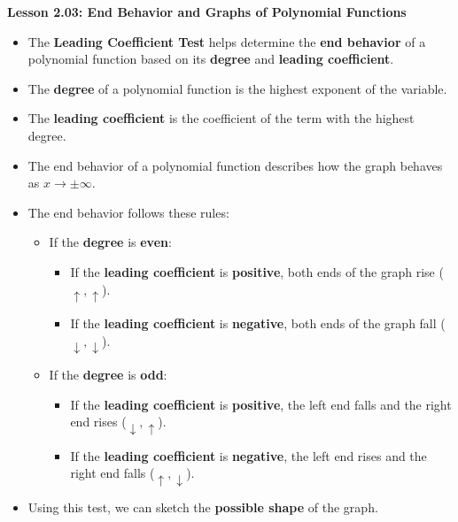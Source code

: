 \begin{center}
\textbf{Lesson 2.03: End Behavior and Graphs of Polynomial Functions}
\end{center}

\vspace*{-1.5ex}

\begin{itemize}
    \item The \textbf{Leading Coefficient Test} helps determine the \textbf{end behavior} of a polynomial function based on its \textbf{degree} and \textbf{leading coefficient}.
    \item The \textbf{degree} of a polynomial function is the highest exponent of the variable.
    \item The \textbf{leading coefficient} is the coefficient of the term with the highest degree.
    \item The end behavior of a polynomial function describes how the graph behaves as \( x \to \pm\infty \).
    \item The end behavior follows these rules:
    \begin{itemize}
        \item If the \textbf{degree} is \textbf{even}:
        \begin{itemize}
            \item If the \textbf{leading coefficient} is \textbf{positive}, both ends of the graph rise (\(\uparrow, \uparrow\)).
            \item If the \textbf{leading coefficient} is \textbf{negative}, both ends of the graph fall (\(\downarrow, \downarrow\)).
        \end{itemize}
        \item If the \textbf{degree} is \textbf{odd}:
        \begin{itemize}
            \item If the \textbf{leading coefficient} is \textbf{positive}, the left end falls and the right end rises (\(\downarrow, \uparrow\)).
            \item If the \textbf{leading coefficient} is \textbf{negative}, the left end rises and the right end falls (\(\uparrow, \downarrow\)).
        \end{itemize}
    \end{itemize}
    \item Using this test, we can sketch the \textbf{possible shape} of the graph.
\end{itemize}
